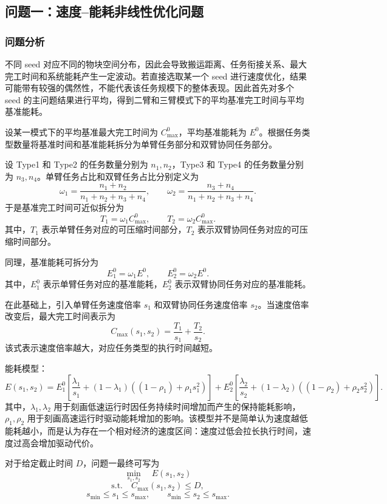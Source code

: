 \subsection{问题一：速度--能耗非线性优化问题}

\subsubsection{问题分析}

不同 seed 对应不同的物块空间分布，因此会导致搬运距离、任务衔接关系、最大完工时间和系统能耗产生一定波动。若直接选取某一个 seed 进行速度优化，结果可能带有较强的偶然性，不能代表该任务规模下的整体表现。因此首先对多个 seed 的主问题结果进行平均，得到二臂和三臂模式下的平均基准完工时间与平均基准能耗。

设某一模式下的平均基准最大完工时间为 $C_{\max}^{0}$，平均基准能耗为 $E^{0}$。根据任务类型数量将基准时间和基准能耗拆分为单臂任务部分和双臂协同任务部分。

设 Type1 和 Type2 的任务数量分别为 $n_1,n_2$，Type3 和 Type4 的任务数量分别为 $n_3,n_4$。单臂任务占比和双臂任务占比分别定义为
\[
	\omega_1
	=
	\frac{n_1+n_2}{n_1+n_2+n_3+n_4},
	\qquad
	\omega_2
	=
	\frac{n_3+n_4}{n_1+n_2+n_3+n_4}.
\]
于是基准完工时间可近似拆分为
\[
	T_1=\omega_1 C_{\max}^{0},
	\qquad
	T_2=\omega_2 C_{\max}^{0}.
\]
其中，$T_1$ 表示单臂任务对应的可压缩时间部分，$T_2$ 表示双臂协同任务对应的可压缩时间部分。

同理，基准能耗可拆分为
\[
	E_1^{0}=\omega_1 E^{0},
	\qquad
	E_2^{0}=\omega_2 E^{0}.
\]
其中，$E_1^{0}$ 表示单臂任务对应的基准能耗，$E_2^{0}$ 表示双臂协同任务对应的基准能耗。

在此基础上，引入单臂任务速度倍率 $s_1$ 和双臂协同任务速度倍率 $s_2$。当速度倍率改变后，最大完工时间表示为
\[
	C_{\max}(s_1,s_2)
	=
	\frac{T_1}{s_1}
	+
	\frac{T_2}{s_2}.
\]
该式表示速度倍率越大，对应任务类型的执行时间越短。

能耗模型：
\[
	E(s_1,s_2)
	=
	E_1^{0}
	\left[
	\frac{\lambda_1}{s_1}
	+
	(1-\lambda_1)
	\left((1-\rho_1)+\rho_1 s_1^2\right)
	\right]
	+
	E_2^{0}
	\left[
	\frac{\lambda_2}{s_2}
	+
	(1-\lambda_2)
	\left((1-\rho_2)+\rho_2 s_2^2\right)
	\right].
\]
其中，$\lambda_1,\lambda_2$ 用于刻画低速运行时因任务持续时间增加而产生的保持能耗影响，$\rho_1,\rho_2$ 用于刻画高速运行时驱动能耗增加的影响。该模型并不是简单认为速度越低能耗越小，而是认为存在一个相对经济的速度区间：速度过低会拉长执行时间，速度过高会增加驱动代价。

对于给定截止时间 $D$，问题一最终可写为
\[
	\min_{s_1,s_2} \quad E(s_1,s_2)
\]
\[
	\mathrm{s.t.} \quad
	C_{\max}(s_1,s_2) \leq D,
\]
\[
	s_{\min} \leq s_1 \leq s_{\max},
	\qquad
	s_{\min} \leq s_2 \leq s_{\max}.
\]

